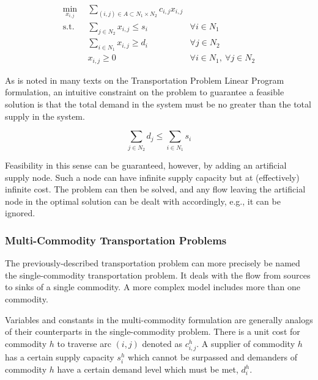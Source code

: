 \begin{subequations}\label{eqs:xport}
  \begin{align}
    \min_{x_{i,j}} \:\: & 
    \sum_{(i, j) \in A \subset N_1 \times N_2} c_{i,j} x_{i,j}
    & \label{eqs:xport_obj} \\
    \text{s.t.} \:\: &
    \sum_{j \in N_2} x_{i,j} \leq s_i
    & \forall i \in N_1  \\
    &
    \sum_{i \in N_1} x_{i,j} \geq d_i
    & \forall j \in N_2  \\
    &
    x_{i,j} \geq 0
    & \forall i \in N_1, \: \forall j \in N_2 \label{eqs:xport_x}
  \end{align}
\end{subequations}

As is noted in many texts on the Transportation Problem Linear Program
formulation, an intuitive constraint on the problem to guarantee a feasible
solution is that the total demand in the system must be no greater than the
total supply in the system.

\begin{equation}
  \sum_{j \in N_2} d_j \leq \sum_{i \in N_1} s_i
\end{equation}

Feasibility in this sense can be guaranteed, however, by adding an artificial
supply node. Such a node can have infinite supply capacity but at (effectively)
infinite cost. The problem can then be solved, and any flow leaving the
artificial node in the optimal solution can be dealt with accordingly, e.g., it
can be ignored.

\subsubsection{Multi-Commodity Transportation Problems}\label{sec:MCTP}
The previously-described transportation problem can more precisely be named the
single-commodity transportation problem. It deals with the flow from sources to
sinks of a single commodity. A more complex model includes more than one
commodity.

Variables and constants in the multi-commodity formulation are generally analogs
of their counterparts in the single-commodity problem. There is a unit cost for
commodity $h$ to traverse arc $(i,j)$ denoted as $c_{i,j}^{h}$. A supplier of
commodity $h$ has a certain supply capacity $s_i^h$ which cannot be surpassed
and demanders of commodity $h$ have a certain demand level which must be met,
$d_i^h$.

